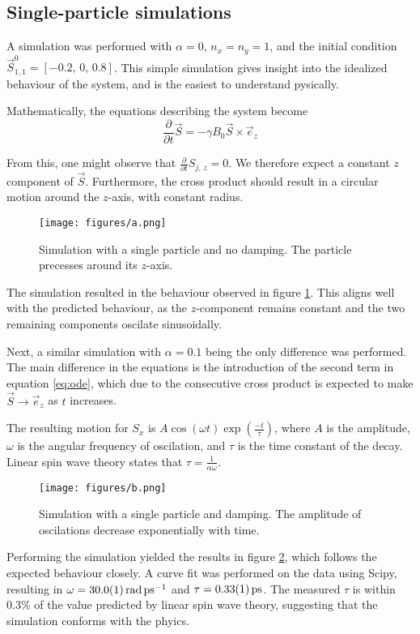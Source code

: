 
\subsection*{Single-particle simulations}
A simulation was performed with $\alpha = 0$, $n_x = n_y = 1$, and the initial condition 
$\vec{S}_{1,1}^0 = \left[-0.2,\, 0,\, 0.8\right]$. 
This simple simulation gives insight into the idealized behaviour of the system, 
and is the easiest to understand pysically.

Mathematically, the equations describing the system become
\begin{equation*}
    \frac{\partial}{\partial t} \vec{S} = -\gamma B_0\vec{S}\times\vec{e}_z
\end{equation*}

From this, one might observe that $\frac{\partial}{\partial t}S_{j,\,z} = 0$. 
We therefore expect a constant $z$ component of $\vec{S}$.
Furthermore, the cross product should result in a circular motion around the $z$-axis, 
with constant radius.

\begin{figure}
    \centering
    \texttt{[image: figures/a.png]}
    \caption{Simulation with a single particle and no damping. 
    The particle precesses around its $z$-axis.}
    \label{fig:a}
\end{figure}

The simulation resulted in the behaviour observed in figure \ref{fig:a}. 
This aligns well with the predicted behaviour, as the $z$-component remains constant and
the two remaining components oscilate sinusoidally.

Next, a similar simulation with $\alpha = 0.1$ being the only difference was performed. 
The main difference in the equations is the introduction of the second term in equation \ref{eq:ode}, 
which due to the consecutive cross product is expected to make 
$\vec{S} \rightarrow \vec{e}_z$ as $t$ increases. 

The resulting motion for $S_x$ is $A\cos(\omega t)\exp(\frac{-t}{\tau})$, 
where $A$ is the amplitude, $\omega$ is the angular frequency of oscilation, 
and $\tau$ is the time constant of the decay. 
Linear spin wave theory states that $\tau = \frac{1}{\alpha\omega}$.

\begin{figure}
    \centering
    \texttt{[image: figures/b.png]}
    \caption{
        Simulation with a single particle and damping. 
        The amplitude of oscilations decrease exponentially with time.
    }
    \label{fig:b}
\end{figure}

Performing the simulation yielded the results in figure \ref{fig:b}, 
which follows the expected behaviour closely. A curve fit was performed on the data using Scipy, 
resulting in $\omega = \SI{30.0\pm0.1}{\radian\per\pico\second}$ and $\tau = \SI{0.33\pm0.01}{\pico\second}$.
The measured $\tau$ is within 0.3\% of the value predicted by linear spin wave theory, 
suggesting that the simulation conforms with the phyics.
